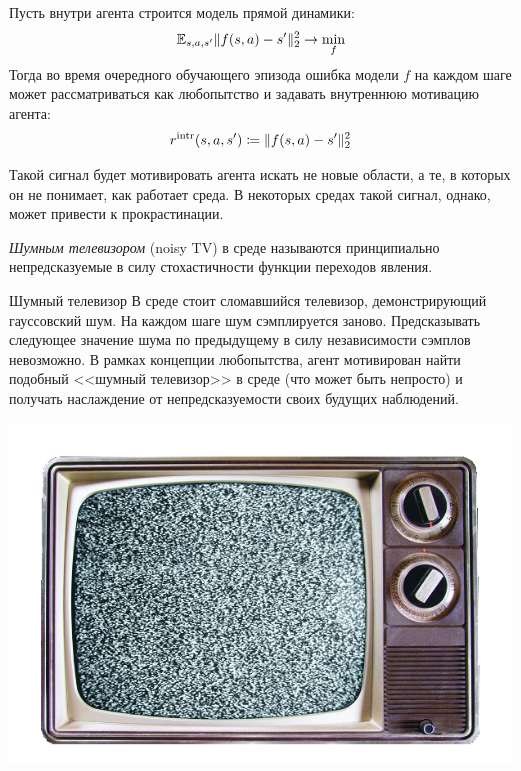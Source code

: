 Пусть внутри агента строится модель прямой динамики:
$$\mathbb{E}_{s,a,s'} \|f(s, a) - s'\|^2_2 \to \min_f$$
Тогда во время очередного обучающего эпизода ошибка модели $f$ на каждом шаге может рассматриваться как любопытство и задавать внутреннюю мотивацию агента:
\begin{equation}\label{curiosity}
r^{\mathrm{intr}}(s, a, s') \coloneqq \|f(s, a) - s'\|^2_2
\end{equation}

Такой сигнал будет мотивировать агента искать не новые области, а те, в которых он не понимает, как работает среда. В некоторых средах такой сигнал, однако, может привести к прокрастинации.

\begin{definition}
\emph{Шумным телевизором} (noisy TV) в среде называются принципиально непредсказуемые в силу стохастичности функции переходов явления.
\end{definition}

\begin{exampleBox}[righthand ratio=0.2, sidebyside, sidebyside align=center, lower separated=false]{Шумный телевизор}
В среде стоит сломавшийся телевизор, демонстрирующий гауссовский шум. На каждом шаге шум сэмплируется заново. Предсказывать следующее значение шума по предыдущему в силу независимости сэмплов невозможно. В рамках концепции любопытства, агент мотивирован найти подобный <<шумный телевизор>> в среде (что может быть непросто) и получать наслаждение от непредсказуемости своих будущих наблюдений.

\tcblower
\includegraphics[width=\textwidth]{Images/noisytv.png}
\end{exampleBox}

